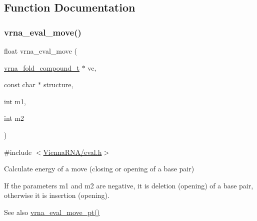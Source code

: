 \subsection{Function Documentation}
\mbox{\label{group__eval__move_gaff1b9e4f4d17b434b0a822fe783672c1}} 
\subsubsection{\texorpdfstring{vrna\_eval\_move()}{vrna\_eval\_move()}}
{\footnotesize\ttfamily float vrna\+\_\+eval\+\_\+move (\begin{DoxyParamCaption}\item[{\mbox{\hyperlink{group__fold__compound_ga1b0cef17fd40466cef5968eaeeff6166}{vrna\+\_\+fold\+\_\+compound\+\_\+t}} $\ast$}]{vc,  }\item[{const char $\ast$}]{structure,  }\item[{int}]{m1,  }\item[{int}]{m2 }\end{DoxyParamCaption})}



{\ttfamily \#include $<$\mbox{\hyperlink{eval_8h}{Vienna\+R\+N\+A/eval.\+h}}$>$}



Calculate energy of a move (closing or opening of a base pair) 

If the parameters m1 and m2 are negative, it is deletion (opening) of a base pair, otherwise it is insertion (opening).

\begin{DoxySeeAlso}{See also}
\mbox{\hyperlink{group__eval__move_ga123dabc119ea98c968a5e903cc46f0fb}{vrna\+\_\+eval\+\_\+move\+\_\+pt()}} 
\end{DoxySeeAlso}

